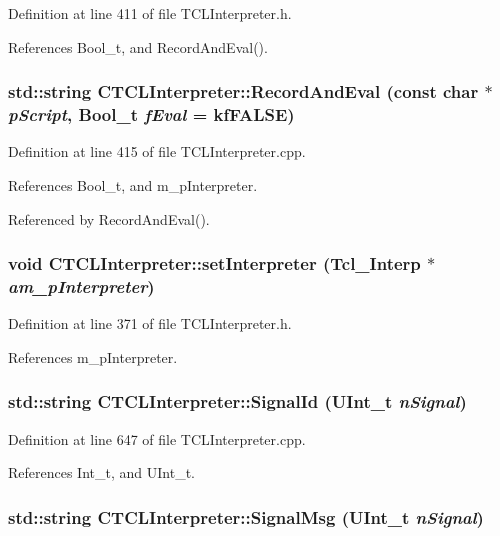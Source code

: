 Definition at line 411 of file TCLInterpreter.h.

References Bool\_\-t, and Record\-And\-Eval().
\subsubsection{\setlength{\rightskip}{0pt plus 5cm}std::string CTCLInterpreter::Record\-And\-Eval (const char $\ast$ {\em p\-Script}, {\bf Bool\_\-t} {\em f\-Eval} = {\bf kf\-FALSE})}\label{classCTCLInterpreter_a14}




Definition at line 415 of file TCLInterpreter.cpp.

References Bool\_\-t, and m\_\-p\-Interpreter.

Referenced by Record\-And\-Eval().
\subsubsection{\setlength{\rightskip}{0pt plus 5cm}void CTCLInterpreter::set\-Interpreter (Tcl\_\-Interp $\ast$ {\em am\_\-p\-Interpreter})\hspace{0.3cm}{\tt  [inline, protected]}}\label{classCTCLInterpreter_b0}




Definition at line 371 of file TCLInterpreter.h.

References m\_\-p\-Interpreter.
\subsubsection{\setlength{\rightskip}{0pt plus 5cm}std::string CTCLInterpreter::Signal\-Id ({\bf UInt\_\-t} {\em n\-Signal})\hspace{0.3cm}{\tt  [static]}}\label{classCTCLInterpreter_d1}




Definition at line 647 of file TCLInterpreter.cpp.

References Int\_\-t, and UInt\_\-t.
\subsubsection{\setlength{\rightskip}{0pt plus 5cm}std::string CTCLInterpreter::Signal\-Msg ({\bf UInt\_\-t} {\em n\-Signal})\hspace{0.3cm}{\tt  [static]}}\label{classCTCLInterpreter_d2}




